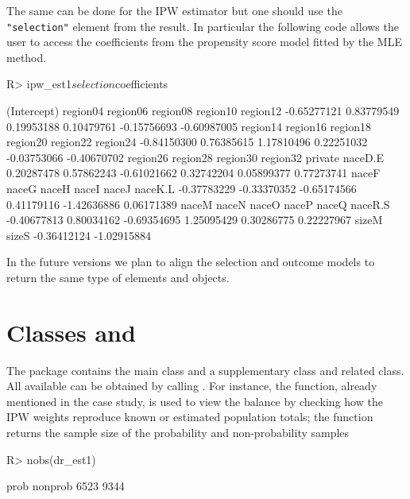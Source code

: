 \documentclass[
]{jss}
\begin{document}
The same can be done for the IPW estimator but one should use the
\texttt{"selection"} element from the result. In particular the
following code allows the user to access the coefficients from the
propensity score model fitted by the MLE method.

\begin{CodeChunk}
\begin{CodeInput}
R> ipw_est1$selection$coefficients
\end{CodeInput}
\begin{CodeOutput}
(Intercept)    region04    region06    region08    region10    region12 
-0.65277121  0.83779549  0.19953188  0.10479761 -0.15756693 -0.60987005 
   region14    region16    region18    region20    region22    region24 
-0.84150300  0.76385615  1.17810496  0.22251032 -0.03753066 -0.40670702 
   region26    region28    region30    region32     private     naceD.E 
 0.20287478  0.57862243 -0.61021662  0.32742204  0.05899377  0.77273741 
      naceF       naceG       naceH       naceI       naceJ     naceK.L 
-0.37783229 -0.33370352 -0.65174566  0.41179116 -1.42636886  0.06171389 
      naceM       naceN       naceO       naceP       naceQ     naceR.S 
-0.40677813  0.80034162 -0.69354695  1.25095429  0.30286775  0.22227967 
      sizeM       sizeS 
-0.36412124 -1.02915884 
\end{CodeOutput}
\end{CodeChunk}

In the future versions we plan to align the selection and outcome models
to return the same type of elements and objects.

\section[Classes and S3Methods]{Classes and }\label{sec-s3methods}

The package contains the main class  and a supplementary
class  and related  class.
All available  can be obtained by calling
. For instance, the 
function, already mentioned in the case study, is used to view the
balance by checking how the IPW weights reproduce known or estimated
population totals; the  function returns the sample size of
the probability and non-probability samples

\begin{CodeChunk}
\begin{CodeInput}
R> nobs(dr_est1)
\end{CodeInput}
\begin{CodeOutput}
   prob nonprob 
   6523    9344 
\end{CodeOutput}
\end{CodeChunk}
\end{document}
